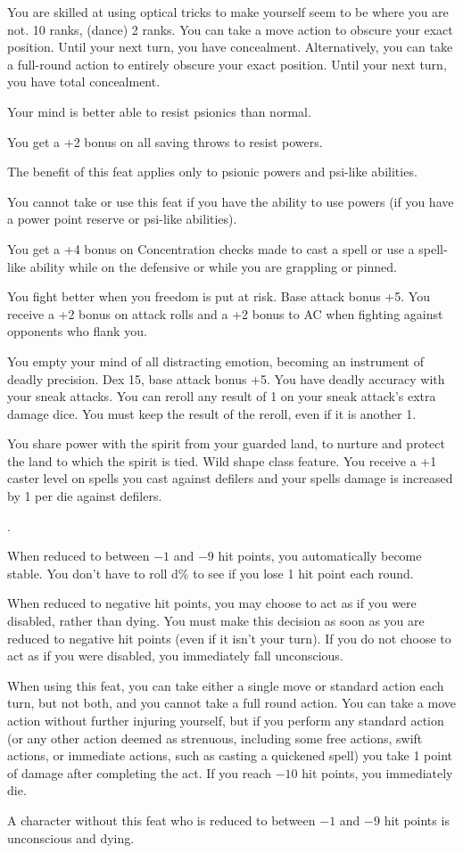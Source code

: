 {You are skilled at using optical tricks to make yourself seem to be where you are not.}
{ 10 ranks,  (dance) 2 ranks.}
{You can take a move action to obscure your exact position. Until your next turn, you have concealment. Alternatively, you can take a full-round action to entirely obscure your exact position. Until your next turn, you have total concealment.}{}{}

{Your mind is better able to resist psionics than normal.}{}
{You get a +2 bonus on all saving throws to resist powers.

The benefit of this feat applies only to psionic powers and psi-like abilities. %
}{}
{You cannot take or use this feat if you have the ability to use powers (if you have a power point reserve or psi-like abilities).}

{You get a +4 bonus on Concentration checks made to cast a spell or use a spell-like ability while on the defensive or while you are grappling or pinned.}

{You fight better when you freedom is put at risk.}
{Base attack bonus +5.}
{You receive a +2 bonus on attack rolls and a +2 bonus to AC when fighting against opponents who flank you.}
{}{}

{You empty your mind of all distracting emotion, becoming an instrument of deadly precision.}
{Dex 15, base attack bonus +5.}
{You have deadly accuracy with your sneak attacks. You can reroll any result of 1 on your sneak attack's extra damage dice. You must keep the result of the reroll, even if it is another 1.}{}{}

{You share power with the spirit from your guarded land, to nurture and protect the land to which the spirit is tied.}
{Wild shape class feature.}
{You receive a +1 caster level on spells you cast against defilers and your spells damage is increased by 1 per die against defilers.}
{}{}

{}
{.}
{When reduced to between $-1$ and $-9$ hit points, you automatically become stable. You don't have to roll d\% to see if you lose 1 hit point each round.

When reduced to negative hit points, you may choose to act as if you were disabled, rather than dying. You must make this decision as soon as you are reduced to negative hit points (even if it isn't your turn). If you do not choose to act as if you were disabled, you immediately fall unconscious.

When using this feat, you can take either a single move or standard action each turn, but not both, and you cannot take a full round action. You can take a move action without further injuring yourself, but if you perform any standard action (or any other action deemed as strenuous, including some free actions, swift actions, or immediate actions, such as casting a quickened spell) you take 1 point of damage after completing the act. If you reach $-10$ hit points, you immediately die.}
{A character without this feat who is reduced to between $-1$ and $-9$ hit points is unconscious and dying.}
{}

